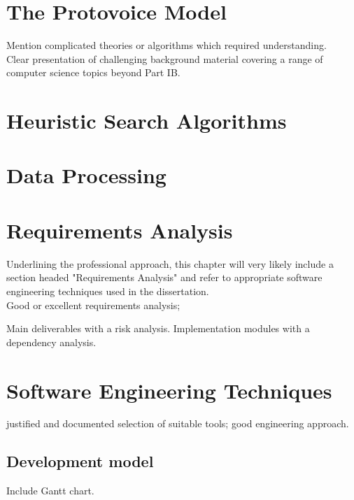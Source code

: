\documentclass[12pt,a4paper,twoside,openright]{report}
\begin{document}
\section{The Protovoice Model}
Mention complicated theories or algorithms which required understanding. \\ 
Clear presentation of challenging background material covering a range of computer science topics beyond Part IB.

\section{Heuristic Search Algorithms}

\section{Data Processing}

\section{Requirements Analysis}
Underlining the professional approach, this chapter will very likely include a section headed "Requirements Analysis" and refer to appropriate software engineering techniques used in the dissertation. \\
Good or excellent requirements analysis; 
\par 
Main deliverables with a risk analysis. 
Implementation modules with a dependency analysis.

\section{Software Engineering Techniques}
justified and documented selection of suitable tools; good engineering approach.

\subsection{Development model}
Include Gantt chart.
\end{document}
